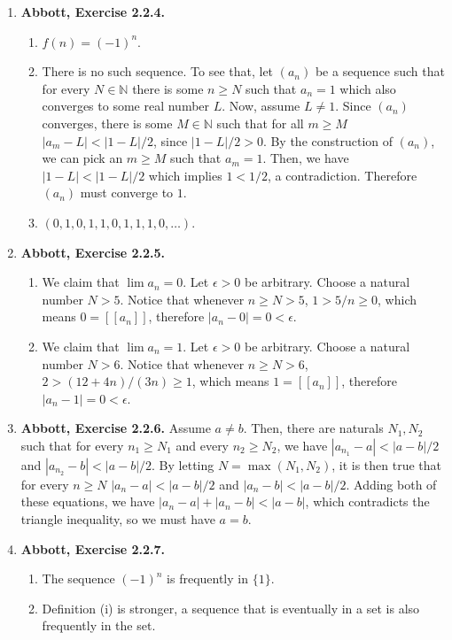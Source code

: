 \documentclass{article}
\newcommand{\N}{\mathbb{N}}
\newcommand{\exc}[2][Abbott]{\item \textbf{#1, Exercise #2.}}
\let\oldmax\max
\renewcommand{\max}[1]{\oldmax \left( #1 \right)}
\begin{document}
\begin{enumerate}
	\exc{2.2.4}
				      	          
	\begin{enumerate}
		\item $f(n) = (-1)^n$.
		\item There is no such sequence. To see that, let $(a_n)$ be a sequence such that for every $N \in \N$ there is some $n \geq N$ such that $a_n = 1$ which also converges to some real number $L$. Now, assume $L \neq 1$. Since $(a_n)$ converges, there is some $M \in \N$ such that for all $m \geq M$ $|a_m - L| < |1-L|/2$, since $|1-L|/2 > 0$. By the construction of $(a_n)$, we can pick an $m \geq M$ such that $a_m = 1$. Then, we have $|1-L| < |1-L|/2$ which implies $1 < 1/2$, a contradiction. Therefore $(a_n)$ must converge to $1$.
		      		      		      	      	      	      	              
		\item $(0, 1, 0, 1, 1, 0, 1, 1, 1, 0, \dots)$.
	\end{enumerate}
				      	          
	\exc{2.2.5}
				      	              
	\begin{enumerate}
		\item We claim that $\lim a_n = 0$. Let $\epsilon > 0$ be arbitrary. Choose a natural number $N > 5$. Notice that whenever $n \geq N > 5$, $1 > 5/n \geq 0$, which means $0 = [[a_n]]$, therefore $|a_n - 0| = 0 < \epsilon$.
		      		      		      	      	      	      	                  
		\item We claim that $\lim a_n = 1$. Let $\epsilon > 0$ be arbitrary. Choose a natural number $N > 6$. Notice that whenever $n \geq N > 6$, $2 > (12+4n)/(3n) \geq 1$, which means $1 = [[a_n]]$, therefore $|a_n - 1| = 0 < \epsilon$.
	\end{enumerate}
				      	              
	\exc{2.2.6}
	Assume $a \neq b$. Then, there are naturals $N_1, N_2$ such that for every $n_1 \geq N_1$ and every $n_2 \geq N_2$, we have $|a_{n_1} - a| < |a-b|/2$ and $|a_{n_2} - b| < |a-b|/2$. By letting $N = \max{N_1, N_2}$, it is then true that for every $n \geq N$ $|a_n - a| < |a-b|/2$ and $|a_n - b| < |a-b|/2$. Adding both of these equations, we have $|a_n - a| + |a_n - b| < |a-b|$, which contradicts the triangle inequality, so we must have $a = b$.
				      	              
	\exc{2.2.7}
				      	              
	\begin{enumerate}
		\item The sequence $(-1)^n$ is frequently in $\{1\}$.
		\item Definition (i) is stronger, a sequence that is eventually in a set is also frequently in the set.
		      		      		      	      	      	      	                  

\end{enumerate}
\end{enumerate}
\end{document}
